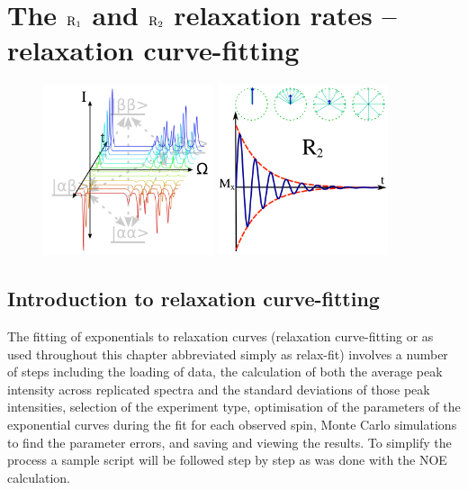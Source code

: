 
\chapter[Relaxation curve-fitting]{The $\mathrm{R}_1$ and $\mathrm{R}_2$ relaxation rates -- relaxation curve-fitting} \label{ch: relax-fit}


\begin{figure}[h]
\includegraphics[width=5cm, bb=0 0 1701 1701]{graphics/analyses/r1_600x600} \hfill \includegraphics[width=5cm, bb=0 0 1701 1701]{graphics/analyses/r2_600x600}
\end{figure}



\section{Introduction to relaxation curve-fitting}

The fitting of exponentials to relaxation curves (relaxation curve-fitting or as used throughout this chapter abbreviated simply as relax-fit) involves a number of steps including the loading of data, the calculation of both the average peak intensity across replicated spectra and the standard deviations of those peak intensities, selection of the experiment type, optimisation of the parameters of the exponential curves during the fit for each observed spin, Monte Carlo simulations to find the parameter errors, and saving and viewing the results.  To simplify the process a sample script will be followed step by step as was done with the NOE calculation.



